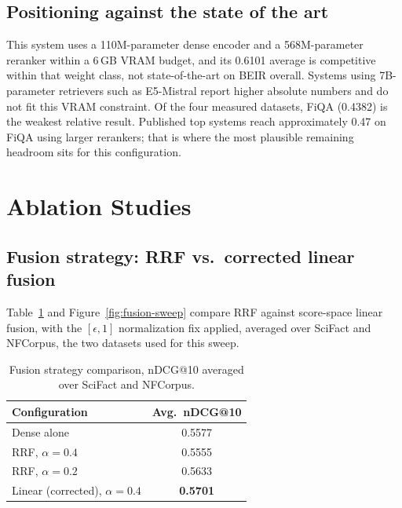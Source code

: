 \documentclass[11pt]{article}
\begin{document}
\subsection{Positioning against the state of the art}

This system uses a 110M-parameter dense encoder and a 568M-parameter reranker within a 6\,GB VRAM budget, and its 0.6101 average is competitive within that weight class, not state-of-the-art on BEIR overall. Systems using 7B-parameter retrievers such as E5-Mistral report higher absolute numbers and do not fit this VRAM constraint. Of the four measured datasets, FiQA (0.4382) is the weakest relative result. Published top systems reach approximately 0.47 on FiQA using larger rerankers; that is where the most plausible remaining headroom sits for this configuration.

\section{Ablation Studies}
\label{sec:ablation}

\subsection{Fusion strategy: RRF vs.\ corrected linear fusion}

Table~\ref{tab:fusion-sweep} and Figure~\ref{fig:fusion-sweep} compare RRF against score-space linear fusion, with the $[\epsilon,1]$ normalization fix applied, averaged over SciFact and NFCorpus, the two datasets used for this sweep.

\begin{table}[h]
\centering
\caption{Fusion strategy comparison, nDCG@10 averaged over SciFact and NFCorpus.}
\label{tab:fusion-sweep}
\begin{tabular}{lc}
\toprule
Configuration & Avg.\ nDCG@10 \\
\midrule
Dense alone & 0.5577 \\
RRF, $\alpha=0.4$ & 0.5555 \\
RRF, $\alpha=0.2$ & 0.5633 \\
Linear (corrected), $\alpha=0.4$ & \textbf{0.5701} \\
\bottomrule
\end{tabular}
\end{table}
\end{document}
